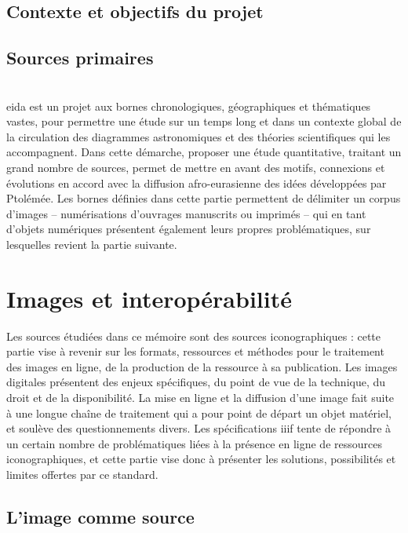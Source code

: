 \documentclass[a4paper,12pt,twoside]{book}
\newcommand{\eida}{\gls{eida}\xspace}
\newcommand{\iiif}{\gls{iiif}\xspace}
\newcommand{\clearemptydoublepage}{\newpage{\pagestyle{empty}\cleardoublepage}}
\begin{document}
                \section{Contexte et objectifs du projet}
                    

                \section{Sources primaires}
                    
		\\
		
		\eida est un projet aux bornes chronologiques, géographiques et thématiques vastes, pour permettre une étude sur un temps long et dans un contexte global de la circulation des diagrammes astronomiques et des théories scientifiques qui les accompagnent. Dans cette démarche, proposer une étude quantitative, traitant un grand nombre de sources, permet de mettre en avant des motifs, connexions et évolutions en accord avec la diffusion afro-eurasienne des idées développées par Ptolémée. Les bornes définies dans cette partie permettent de délimiter un corpus d'images -- numérisations d'ouvrages manuscrits ou imprimés -- qui en tant d'objets numériques présentent également leurs propres problématiques, sur lesquelles revient la partie suivante.
        \clearemptydoublepage
        
        \chapter{Images et interopérabilité}
        Les sources étudiées dans ce mémoire sont des sources iconographiques : cette partie vise à revenir sur les formats, ressources et méthodes pour le traitement des images en ligne, de la production de la ressource à sa publication. Les images digitales présentent des enjeux spécifiques, du point de vue de la technique, du droit et de la disponibilité. La mise en ligne et la diffusion d'une image fait suite à une longue chaîne de traitement qui a pour point de départ un objet matériel, et soulève des questionnements divers. Les spécifications \iiif tente de répondre à un certain nombre de problématiques liées à la présence en ligne de ressources iconographiques, et cette partie vise donc à présenter les solutions, possibilités et limites offertes par ce standard.
        
                \section{L’image comme source}
                    
            
\end{document}
